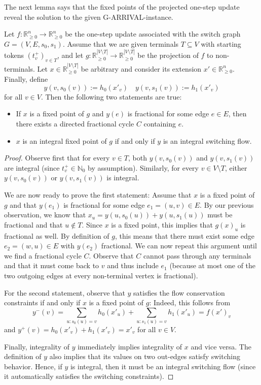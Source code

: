 \documentclass[a4paper,UKenglish,cleveref, autoref, thm-restate]{lipics-v2021}
\newcommand{\N}{\mathbb{N}}
\newcommand{\R}{\mathbb{R}}
\newcommand{\problem}[1]{\textrm{#1}}
\newcommand{\garrival}{\problem{G-ARRIVAL}}
\begin{document}
The next lemma says that the fixed points of the projected one-step update reveal the solution to the given \garrival-instance. 

\begin{lemma}
\label{lemma:interpretation}
    Let $f : \R^n_{\geq 0} \rightarrow \R^n_{\geq 0}$ be the one-step update associated with the switch graph $G = (V, E, s_0, s_1)$. Assume that we are given terminals $T \subseteq V$ with starting tokens $(t^+_v)_{v \in T}$, and let $g : \R^{|V \setminus T|}_{\geq 0} \rightarrow \R^{|V \setminus T|}_{\geq 0}$ be the projection of $f$ to non-terminals. Let $x \in \R^{|V \setminus T|}_{\geq 0}$ be arbitrary and consider its extension $x' \in \R^n_{\geq 0}$. Finally, define 
    \[
        y(v, s_0(v)) := h_0(x'_v) \quad
        y(v, s_1(v)) := h_1(x'_v) 
    \]
    for all $v \in V$. Then the following two statements are true: 
    \begin{itemize}
        \item If $x$ is a fixed point of $g$ and $y(e)$ is fractional for some edge $e \in E$, then there exists a directed fractional cycle $C$ containing $e$. 
        \item $x$ is an integral fixed point of $g$ if and only if $y$ is an integral switching flow. 
    \end{itemize}
\end{lemma}
\begin{proof}
    Observe first that for every $v \in T$, both $ y(v, s_0(v))$ and $ y(v, s_1(v))$ are integral (since $t^+_v \in \N_0$ by assumption). Similarly, 
    for every $v \in V \setminus T$, either $ y(v, s_0(v))$ or $ y(v, s_1(v))$ is integral.
    
    We are now ready to prove the first statement: Assume that $x$ is a fixed point of $g$ and that $y(e_1)$ is fractional for some edge $e_1 = (u, v) \in E$. By our previous observation, we know that $x_u = y(u, s_0(u)) + y(u, s_1(u))$ must be fractional and that $u \notin T$. Since $x$ is a fixed point, this implies that $g(x)_u$ is fractional as well. By definition of $g$, this means that there must exist some edge $e_2 = (w, u) \in E$ with $y(e_2)$ fractional. We can now repeat this argument until we find a fractional cycle $C$. Observe that $C$ cannot pass through any terminals and that it must come back to $v$ and thus include $e_1$ (because at most one of the two outgoing edges at every non-terminal vertex is fractional). 
    
    For the second statement, observe that $y$ satisfies the flow conservation constraints if and only if $x$ is a fixed point of $g$: Indeed, this follows from 
    \[
        y^-(v) = \sum_{u:s_0(u) = v} h_0(x'_u) + \sum_{u:s_1(u) = v} h_1(x'_u) = f(x')_v
    \]
    and $y^+(v) = h_0(x'_v) + h_1(x'_v) = x'_v$ for all $v \in V$.
    
    Finally, integrality of $y$ immediately implies integrality of $x$ and vice versa. The definition of $y$ also implies that its values on two out-edges satisfy switching behavior. Hence, if $y$ is integral, then it must be an integral switching flow (since it automatically satisfies the switching constraints). 
\end{proof}
\end{document}
